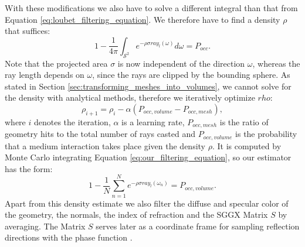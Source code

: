 With these modifications we also have to solve a different integral than that from Equation \ref{eq:loubet_filtering_equation}.
We therefore have to find a density $\rho$ that suffices:
\begin{equation}
    1 - \frac{1}{4\pi}\int_{\mathcal{S}^2} e^{-\rho\sigma ray_l(\omega)} d\omega = P_{occ}.
    \label{eq:our_filtering_equation}
\end{equation}
Note that the projected area $\sigma$ is now independent of the direction $\omega$, whereas the ray length depends on $\omega$, since the rays are clipped by the bounding sphere.
As stated in Section \ref{sec:transforming_meshes_into_volumes}, we cannot solve for the density with analytical methods, therefore we iteratively optimize $rho$:
\begin{equation*}
    \rho_{i+1}=\rho_i - \alpha (P_{occ,volume} - P_{occ,mesh}),
\end{equation*}
where $i$ denotes the iteration, $\alpha$ is a learning rate, $P_{occ,mesh}$ is the ratio of geometry hits to the total number of rays casted and $P_{occ,volume}$ is the probability that a medium interaction takes place given the density $\rho$.
It is computed by Monte Carlo integrating Equation \ref{eq:our_filtering_equation}, so our estimator has the form:
\begin{equation*}
    1 - \frac{1}{N}\sum_{n=1}^{N} e^{-\rho\sigma ray_l(\omega_n)} = P_{occ,volume}.
\end{equation*}
Apart from this density estimate we also filter the diffuse and specular color of the geometry, the normals, the index of refraction and the SGGX Matrix $S$ by averaging.
The Matrix $S$ serves later as a coordinate frame for sampling reflection directions with the phase function \cite{sggx}.

